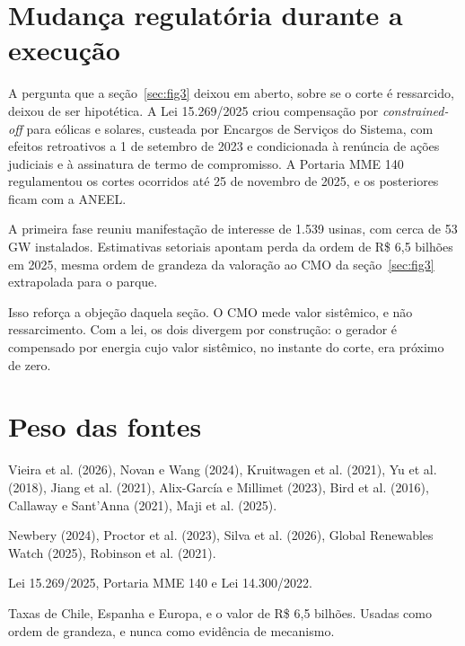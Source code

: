 \begin{landscape}
\section*{Mudança regulatória durante a execução}

\begin{promancha}
A pergunta que a seção~\ref{sec:fig3} deixou em aberto, sobre se o corte é
ressarcido, deixou de ser hipotética. A Lei 15.269/2025 criou compensação por
\textit{constrained-off} para eólicas e solares, custeada por Encargos de
Serviços do Sistema, com efeitos retroativos a 1 de setembro de 2023 e
condicionada à renúncia de ações judiciais e à assinatura de termo de
compromisso. A Portaria MME 140 regulamentou os cortes ocorridos até 25 de
novembro de 2025, e os posteriores ficam com a ANEEL.

A primeira fase reuniu manifestação de interesse de 1.539 usinas, com cerca de
53 GW instalados. Estimativas setoriais apontam perda da ordem de R\$ 6,5
bilhões em 2025, mesma ordem de grandeza da valoração ao CMO da
seção~\ref{sec:fig3} extrapolada para o parque.

Isso reforça a objeção daquela seção. O CMO mede valor sistêmico, e não
ressarcimento. Com a lei, os dois divergem por construção: o gerador é
compensado por energia cujo valor sistêmico, no instante do corte, era próximo
de zero.
\end{promancha}

\section*{Peso das fontes}

\begin{promancha}
 Vieira et al. (2026), Novan e Wang (2024),
Kruitwagen et al. (2021), Yu et al. (2018), Jiang et al. (2021), Alix-García e
Millimet (2023), Bird et al. (2016), Callaway e Sant'Anna (2021), Maji et al.
(2025).

 Newbery (2024), Proctor et al. (2023), Silva
et al. (2026), Global Renewables Watch (2025), Robinson et al. (2021).

 Lei 15.269/2025, Portaria MME 140 e Lei 14.300/2022.

 Taxas de Chile, Espanha e Europa, e o valor de R\$ 6,5
bilhões. Usadas como ordem de grandeza, e nunca como evidência de mecanismo.
\end{promancha}

\end{landscape}
